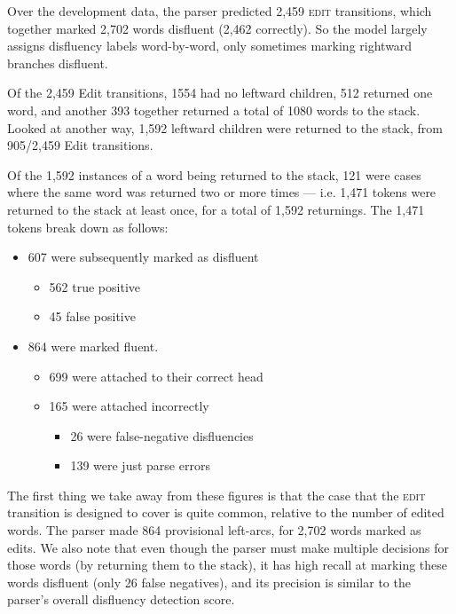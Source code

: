 \documentclass[11pt,letterpaper]{article}
\newcommand{\edittrans}{\textsc{edit}\xspace}
\begin{document}
Over the development data, the parser predicted 2,459 \edittrans transitions,
which together marked 2,702
words disfluent (2,462 correctly). So the model largely assigns disfluency labels
word-by-word, only sometimes marking rightward branches disfluent.

Of the 2,459 Edit transitions, 1554 had no leftward children, 512 returned one word,
and another 393 together returned a total of 1080 words to the stack. Looked at
another way, 1,592 leftward children were returned to the stack, from
905/2,459 Edit transitions.

Of the 1,592 instances of a word being returned to the stack, 121 were cases where
the same word was returned two or more times --- i.e. 1,471 tokens were returned
to the stack at least once, for a total of 1,592 returnings.
The 1,471 tokens break down as follows:

\begin{itemize}
    \item 607 were subsequently marked as disfluent
        \begin{itemize}
            \item 562 true positive
            \item 45 false positive
        \end{itemize}
    \item 864 were marked fluent.
        \begin{itemize}
            \item 699 were attached to their correct head
            \item 165 were attached incorrectly
            \begin{itemize}
                \item 26 were false-negative disfluencies
                \item 139 were just parse errors
            \end{itemize}
        \end{itemize}
\end{itemize}

The first thing we take away from these figures is that the case that the \edittrans
transition is designed to cover is quite common, relative to the number of edited
words.  The parser made 864 provisional left-arcs, for 2,702 words marked as 
edits.  We also note that even though the parser must make multiple decisions for
those words (by returning them to the stack), it has high recall at marking these
words disfluent (only 26 false negatives), and its precision is similar to
the parser's overall disfluency detection score.
\end{document}
